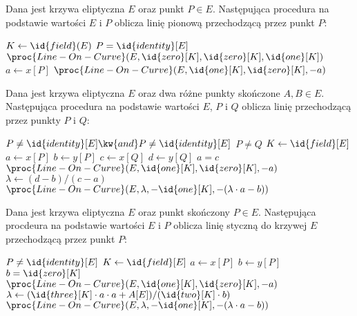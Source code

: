 \begin{algorithm}
Dana jest krzywa eliptyczna $E$
oraz punkt $P \in E$.
Następująca procedura
na podstawie wartości $E$ i $P$
oblicza
linię pionową przechodzącą przez punkt $P$:

\begin{codebox}
\li
    $K \gets \id{field}(E)$
\li
    \If $P = \id{identity}[E]$
\li
        \Then
            \Return $\proc{Line-On-Curve}(E, \id{zero}[K], \id{zero}[K], \id{one}[K])$
\li
        \Else
            $a \gets x[P]$
\li
            \Return $\proc{Line-On-Curve}(E, \id{one}[K], \id{zero}[K], -a)$
        \End
\end{codebox}
\end{algorithm}

\begin{algorithm}
Dana jest krzywa eliptyczna $E$
oraz dwa różne punkty skończone $A, B \in E$.
Następująca procedura
na podstawie wartości $E$, $P$ i $Q$
oblicza
linię przechodzącą przez punkty $P$ i $Q$:

\begin{codebox}
\li
    \Assert $P \neq \id{identity}[E] \kw{ and } P \neq \id{identity}[E]$
\li
    \Assert $P \neq Q$
\li
    $K \gets \id{field}[E]$
\li
    $a \gets x[P]$
\li
    $b \gets y[P]$
\li
    $c \gets x[Q]$
\li
    $d \gets y[Q]$
\li
    \If $a = c$
\li
        \Then
            \Return $\proc{Line-On-Curve}(E, \id{one}[K], \id{zero}[K], -a)$
\li
        \Else
            $\lambda \gets (d-b)/(c-a)$
\li
            \Return $\proc{Line-On-Curve}(E, \lambda, -\id{one}[K], -(\lambda\cdot a - b))$
        \End
\end{codebox}
\end{algorithm}

\begin{algorithm}
Dana jest krzywa eliptyczna $E$
oraz punkt skończony $P \in E$.
Następująca procdeura
na podstawie wartości $E$ i $P$
oblicza
linię styczną do krzywej $E$ przechodzącą przez punkt $P$:

\begin{codebox}
\li
    \Assert $P \neq \id{identity}[E]$
\li
    $K \gets \id{field}[E]$
\li
    $a \gets x[P]$
\li
    $b \gets y[P]$
\li
    \If $b = \id{zero}[K]$
\li
        \Then
            \Return $\proc{Line-On-Curve}(E, \id{one}[K], \id{zero}[K], -a)$
\li
        \Else
            $\lambda \gets (\id{three}[K]\cdot a \cdot a + A[E])/(\id{two}[K]\cdot b)$
\li
            \Return $\proc{Line-On-Curve}(E, \lambda, -\id{one}[K], -(\lambda\cdot a - b))$
        \End
\end{codebox}
\end{algorithm}


